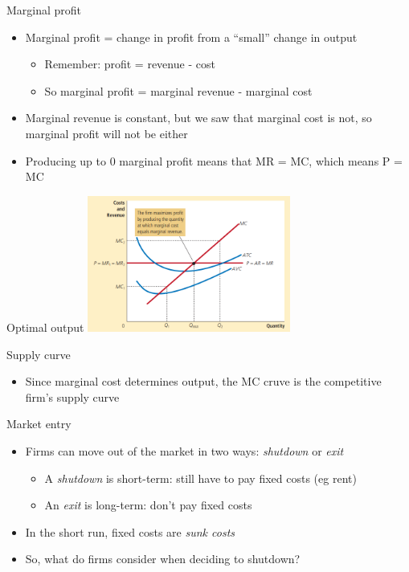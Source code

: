 \documentclass[aspectratio=169]{beamer}
\begin{document}
\begin{frame}{Marginal profit}
    \begin{itemize}
        \item Marginal profit = change in profit from a ``small'' change in output
            \begin{itemize}
                \item Remember: profit = revenue - cost
                \item So marginal profit = marginal revenue - marginal cost
            \end{itemize}
        \item Marginal revenue is constant, but we saw that marginal cost is not, so marginal profit will not be either
        \item Producing up to 0 marginal profit means that MR = MC, which means P = MC
    \end{itemize}
\end{frame}

\begin{frame}{Optimal output}
    \centering
    \includegraphics[width = 0.5\textwidth,keepaspectratio]{../figs/MReMC.png}
\end{frame}

\begin{frame}{Supply curve}
    \begin{itemize}
        \item Since marginal cost determines output, the MC cruve is the competitive firm's supply curve
    \end{itemize}
\end{frame}

\begin{frame}{Market entry}
    \begin{itemize}
        \item Firms can move out of the market in two ways: \textit{shutdown} or \textit{exit}
            \begin{itemize}
                \item A \textit{shutdown} is short-term: still have to pay fixed costs (eg rent)
                \item An \textit{exit} is long-term: don't pay fixed costs
            \end{itemize}
        \item In the short run, fixed costs are \textit{sunk costs}
        \item So, what do firms consider when deciding to shutdown?
    \end{itemize}
\end{frame}
\end{document}
